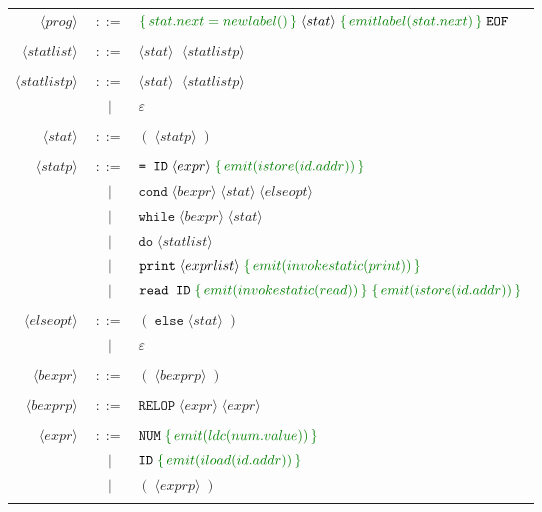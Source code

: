 \documentclass{article}
\newcommand{\cmd}[1]{\textcolor{MyGreen}{\{\, #1 \,\}} \;}
\newcommand{\node}[1]{\langle #1 \rangle \;}
\begin{document}
  \begin{center}
    \begin{tabular}{ r c l }
      $\node{prog}$       & $::=$ & $\cmd{stat.next = newlabel()} \node{stat} \cmd{emitlabel(stat.next)} \texttt{EOF}$ \\\\
      $\node{statlist}$   & $::=$ & $\node{stat}$ $\node{statlistp}$ \\\\
      $\node{statlistp}$  & $::=$ & $\node{stat}$ $\node{statlistp}$ \\
                          &  $|$  & $\varepsilon$ \\\\
      $\node{stat}$       & $::=$ & $(\; \node{statp})$ \\\\
      $\node{statp}$      & $::=$ & $\texttt{= ID}\; \node{expr} \cmd{emit(istore(id.addr))}$ \\
                          &  $|$  & $\texttt{cond}\; \node{bexpr} \node{stat} \node{elseopt}$\\
                          &  $|$  & $\texttt{while}\; \node{bexpr} \node{stat}$ \\
                          &  $|$  & $\texttt{do}\; \node{statlist}$ \\
                          &  $|$  & $\texttt{print}\; \node{exprlist} \cmd{emit(invokestatic(print))}$ \\
                          &  $|$  & $\texttt{read ID}\; \cmd{emit(invokestatic(read))} \cmd{emit(istore(id.addr))}$ \\\\
      $\node{elseopt}$    & $::=$ & $(\; \texttt{else}\; \node{stat})$ \\
                          &  $|$  & $\varepsilon$ \\\\
      $\node{bexpr}$      & $::=$ & $(\; \node{bexprp} )$ \\\\
      $\node{bexprp}$     & $::=$ & $\texttt{RELOP}\; \node{expr} \node{expr}$ \\\\
      $\node{expr}$       & $::=$ & $\texttt{NUM}\; \cmd{emit(ldc(num.value))}$ \\
                          &  $|$  & $\texttt{ID}\; \cmd{emit(iload(id.addr))}$\\
                          &  $|$  & $(\; \node{exprp} )$ \\\\

\end{tabular}
\end{center}
\end{document}
